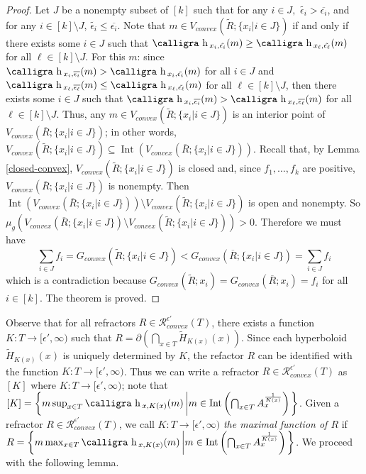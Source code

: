 \documentclass[review]{elsarticle}
\DeclareMathOperator*{\Int}{Int}
\newcommand{\h}{\text{\calligra h}\,}
\begin{document}
\begin{proof}
Let $J$ be a nonempty subset of $[k]$ such that for any $i \in J,$ $\tilde{\epsilon_i} > \overline{\epsilon_i}$, and for any $i\in [k]\setminus J$, $\tilde{\epsilon_i} \le \overline{\epsilon_i}$. Note that $m\in V_{convex}(\tilde{R};\{x_i|i \in J \})$ if and only if there exists some $i\in J$ such that $\h_{x_i,\tilde{\epsilon_i}}(m)\ge \h_{x_\ell,\tilde{\epsilon_\ell}}(m)$ for all $\ell\in [k]\setminus J.$ For this $m$: since $\h_{x_i,\overline{\epsilon_i}}(m)>\h_{x_i,\tilde{\epsilon_i}}(m)$ for all $i\in J$ and $\h_{x_\ell,\overline{\epsilon_\ell}}(m)\le \h_{x_\ell,\tilde{\epsilon_\ell}}(m)$ for all $\ell\in [k]\setminus J$, then there exists some $i\in J$ such that $\h_{x_i,\overline{\epsilon_i}}(m)> \h_{x_\ell,\overline{\epsilon_\ell}}(m)$ for all $\ell\in [k]\setminus J$. Thus, any $m \in V_{convex}(\tilde{R};\{x_i|i \in J \})$ is an interior point of $V_{convex}(\overline{R};\{x_i|i \in J \})$; in other words, $V_{convex}(\tilde{R};\{x_i|i \in J \})\subseteq \Int(V_{convex}(\overline{R};\{x_i|i \in J \}))$. Recall that, by Lemma \ref{closed-convex}, $V_{convex}(\tilde{R};\{x_i|i \in J \})$ is closed and, since $f_1,\dots,f_k$ are positive, $V_{convex}(\overline{R};\{x_i|i \in J \})$ is nonempty. Then $\Int(V_{convex}(\overline{R};\{x_i|i \in J \}))\setminus V_{convex}(\tilde{R};\{x_i|i \in J \})$ is open and nonempty. So $\mu_g(V_{convex}(\overline{R};\{x_i|i \in J \})\setminus V_{convex}(\tilde{R};\{x_i|i \in J \}))>0$. Therefore we must have
    \begin{equation}
        \sum_{i\in J} f_i=G_{convex}(\tilde{R};\{x_i|i \in J \})<G_{convex}(\overline{R};\{x_i|i \in J \})=\sum_{i\in J} f_i
    \end{equation}
which is a contradiction because $G_{convex}(\tilde{R};x_i)=G_{convex}(\overline{R};x_i)=f_i$ for all $i\in[k].$ The theorem is proved.
\end{proof}

 Observe that for all refractors $R\in \mathcal{R}_{convex}^{\epsilon'}(T)$, there exists a function $K:T\to [\epsilon',\infty)$ such that $R=\partial(\bigcap_{x\in T} \tilde{H}_{K(x)}(x))$. Since each hyperboloid $\tilde{H}_{K(x)}(x)$ is uniquely determined by $K$, the refactor $R$ can be identified with the function $K:T\to [\epsilon',\infty)$. Thus we can write a refractor $R\in \mathcal{R}_{convex}^{\epsilon'}(T)$ as $[K]$ where $K:T\to[\epsilon', \infty)$; note that $[K]=\left\{m\sup_{x\in T}\h_{x,K(x)}(m)\left|m\in \Int\left(\bigcap_{x\in T} A_x^{\frac1{K(x)}}\right)\right.\right\}$. Given a refractor $R\in \mathcal{R}_{convex}^{\epsilon'}(T)$, we call $K:T\to[\epsilon', \infty)$ {\it the maximal function of $R$} if $R=\left\{m\max_{x\in T}\h_{x,K(x)}(m)\left|m\in \Int\left(\bigcap_{x\in T} A_x^{\frac1{K(x)}}\right)\right.\right\}$. We proceed with the following lemma. 
\end{document}
